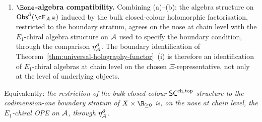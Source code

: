 \begin{theorem}
\begin{enumerate}[label=\textup{(\alph*)}]
\begin{equation}\label{eq:boundary-chiral-product}
 \iota^*\bigl(\mu^{\mathrm{hol},\,\mathrm{bulk}}_\Delta\bigr)(a,b)
 \;=\;
 \Delta_{X,*}\bigl[(a_{(-1)}b)(w)\bigr]
 \;=\;
 \Delta_{X,*}\bigl[\mu^{\mathrm{ch}}_\cA(a,b)(w)\bigr]
\end{equation}
for all $a, b \in \bar\cA$, where the right-hand side is the
$\Delta_*$-extension of the chiral product on the boundary algebra.
\item \textbf{$\Eone$-algebra compatibility.} Combining (a)--(b):
the algebra structure on \(\Obs^\partial(\cF_{\cA,\Xi})\) induced by the
bulk closed-colour holomorphic factorisation, restricted to the
boundary stratum, agrees on the nose at chain level with the
$E_1$-chiral algebra structure on $\mathcal{A}$ used to specify the
boundary condition, through the comparison
\(\eta^\partial_{\mathcal{A}}\). The boundary identification of
Theorem~\ref{thm:universal-holography-functor}~(i) is therefore an
identification of $E_1$-chiral algebras at chain level on the
chosen \(\Xi\)-representative, not only at the level of underlying
objects.
\end{enumerate}
Equivalently: \emph{the restriction of the bulk closed-colour
$\mathsf{SC}^{\mathrm{ch},\mathrm{top}}$-structure to the codimension-one boundary stratum of
$X \times \R_{\geq 0}$ is, on the nose at chain level, the
$E_1$-chiral OPE on $\mathcal{A}$, through
\(\eta^\partial_{\mathcal{A}}\).}
\end{theorem}

